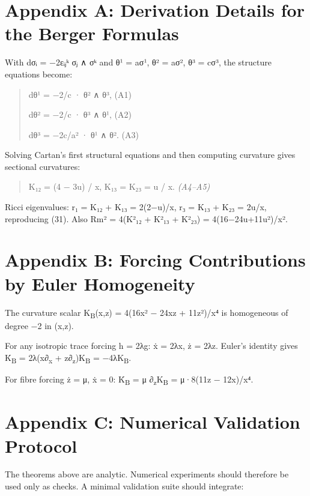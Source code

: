 \documentclass[
]{article}
\begin{document}
\section{Appendix A: Derivation Details for the Berger Formulas}\label{appendix-a-derivation-details-for-the-berger-formulas}

With dσᵢ = −2εᵢⱼᵏ σⱼ ∧ σᵏ and θ¹ = aσ¹, θ² = aσ², θ³ = cσ³, the structure equations become:

\begin{quote}
dθ¹ = −2/c · θ² ∧ θ³, (A1)

dθ² = −2/c · θ³ ∧ θ¹, (A2)

dθ³ = −2c/a² · θ¹ ∧ θ². (A3)
\end{quote}

Solving Cartan's first structural equations and then computing curvature gives sectional curvatures:

\begin{quote}
K₁₂ = (4 − 3u) / x, K₁₃ = K₂₃ = u / x. \emph{(A4--A5)}
\end{quote}

Ricci eigenvalues: r₁ = K₁₂ + K₁₃ = 2(2−u)/x, r₃ = K₁₃ + K₂₃ = 2u/x, reproducing (31). Also \textbar Rm\textbar² = 4(K²₁₂ + K²₁₃ + K²₂₃) = 4(16−24u+11u²)/x².

\section{Appendix B: Forcing Contributions by Euler Homogeneity}\label{appendix-b-forcing-contributions-by-euler-homogeneity}

The curvature scalar K\textsubscript{B}(x,z) = 4(16x² − 24xz + 11z²)/x⁴ is homogeneous of degree −2 in (x,z).

For any isotropic trace forcing h = 2λg: ẋ = 2λx, ż = 2λz. Euler's identity gives K̇\textsubscript{B} = 2λ(x∂\textsubscript{x} + z∂\textsubscript{z})K\textsubscript{B} = −4λK\textsubscript{B}.

For fibre forcing ż = μ, ẋ = 0: K̇\textsubscript{B} = μ ∂\textsubscript{z}K\textsubscript{B} = μ·8(11z − 12x)/x⁴.

\section{Appendix C: Numerical Validation Protocol}\label{appendix-c-numerical-validation-protocol}

The theorems above are analytic. Numerical experiments should therefore be used only as checks. A minimal validation suite should integrate:
\end{document}
